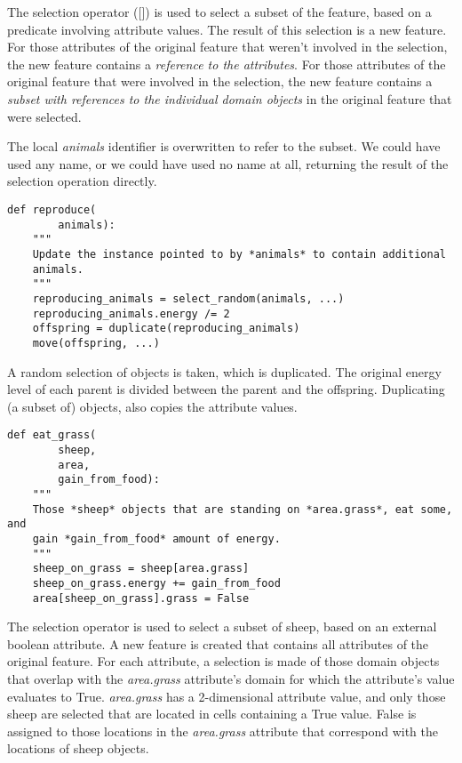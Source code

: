 \documentclass[10pt, a4paper]{article}
\begin{document}
The selection operator ([]) is used to select a subset of the feature, based on a predicate involving attribute values. The result of this selection is a new feature. For those attributes of the original feature that weren't involved in the selection, the new feature contains a \emph{reference to the attributes}. For those attributes of the original feature that were involved in the selection, the new feature contains a \emph{subset with references to the individual domain objects} in the original feature that were selected.

The local \emph{animals} identifier is overwritten to refer to the subset. We could have used any name, or we could have used no name at all, returning the result of the selection operation directly.

\begin{lstlisting}
def reproduce(
        animals):
    """
    Update the instance pointed to by *animals* to contain additional
    animals.
    """
    reproducing_animals = select_random(animals, ...)
    reproducing_animals.energy /= 2
    offspring = duplicate(reproducing_animals)
    move(offspring, ...)
\end{lstlisting}

A random selection of objects is taken, which is duplicated. The original energy level of each parent is divided between the parent and the offspring.  Duplicating (a subset of) objects, also copies the attribute values.

\begin{lstlisting}
def eat_grass(
        sheep,
        area,
        gain_from_food):
    """
    Those *sheep* objects that are standing on *area.grass*, eat some, and
    gain *gain_from_food* amount of energy.
    """
    sheep_on_grass = sheep[area.grass]
    sheep_on_grass.energy += gain_from_food
    area[sheep_on_grass].grass = False
\end{lstlisting}

The selection operator is used to select a subset of sheep, based on an external boolean attribute. A new feature is created that contains all attributes of the original feature. For each attribute, a selection is made of those domain objects that overlap with the \emph{area.grass} attribute's domain for which the attribute's value evaluates to True. \emph{area.grass} has a 2-dimensional attribute value, and only those sheep are selected that are located in cells containing a True value. False is assigned to those locations in the \emph{area.grass} attribute that correspond with the locations of sheep objects.
\end{document}
